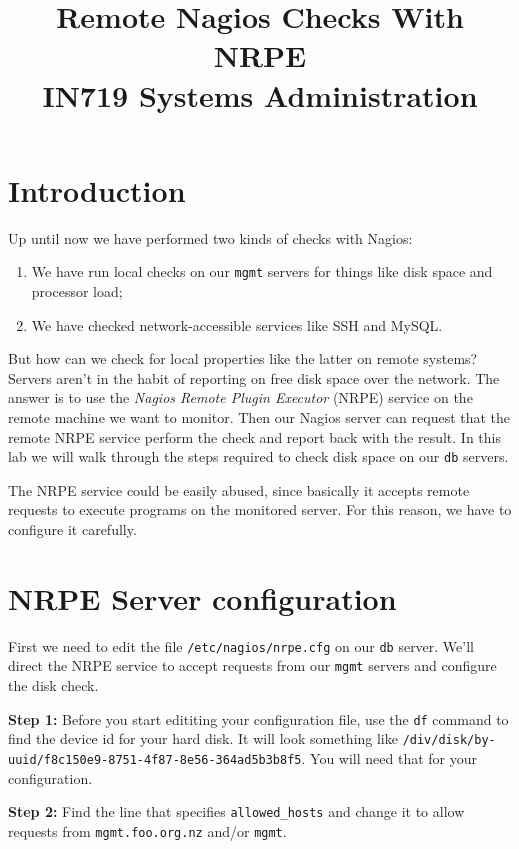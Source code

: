 \documentclass{article}   	%
\title{Remote Nagios Checks With NRPE\\ IN719 Systems Administration}
\date{}							%
\begin{document}
\maketitle

\section*{Introduction}
Up until now we have performed two kinds of checks with Nagios:

\begin{enumerate}
  \item We have run local checks on our \texttt{mgmt} servers for things like disk space and processor load;
  \item We have checked network-accessible services like SSH and MySQL.
\end{enumerate}

But how can we check for local properties like the latter on remote systems?  Servers aren't in the habit of reporting on free disk space over the network.  The answer is to use the \emph{Nagios Remote Plugin Executor} (NRPE) service on the remote machine we want to monitor.  Then our Nagios server can request that the remote NRPE service perform the check and report back with the result.  In this lab we will walk through the steps required to check disk space on our \texttt{db} servers.

The NRPE service could be easily abused, since basically it accepts remote requests to execute programs on the monitored server.  For this reason, we have to configure it carefully.

\section{NRPE Server configuration}
First we need to edit the file \texttt{/etc/nagios/nrpe.cfg} on our \texttt{db} server.  We'll direct the NRPE service to accept requests from our \texttt{mgmt} servers and configure the disk check.

\textbf{Step 1:} Before you start edititing your configuration file, use the \texttt{df} command to find the device id for your hard disk.  It will look something like \texttt{/div/disk/by-uuid/f8c150e9-8751-4f87-8e56-364ad5b3b8f5}.  You will need that for your configuration.

\textbf{Step 2:} Find the line that specifies \texttt{allowed\_hosts} and change it to allow requests from \texttt{mgmt.foo.org.nz} and/or \texttt{mgmt}.
\end{document}
